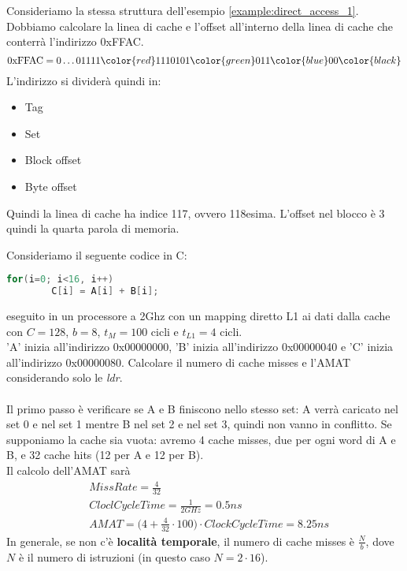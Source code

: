 \begin{example}
	Consideriamo la stessa struttura dell'esempio \ref{example:direct_access_1}. Dobbiamo calcolare la linea di cache e l'offset all'interno della linea
	di cache che conterrà l'indirizzo 0xFFAC.\\
	\begin{equation*}
		\text{0xFFAC} = 0\ldots01111 \color{red}1110 101\color{green}0 11\color{blue}00\color{black} 
	\end{equation*}
	L'indirizzo si dividerà quindi in:
	\begin{itemize}
		\item Tag
		\item \color{red}Set\color{black}
		\item \color{green}Block offset\color{black}
		\item \color{blue}Byte offset \color{black}
	\end{itemize}
	Quindi la linea di cache ha indice 117, ovvero 118esima. L'offset nel blocco è 3 quindi la quarta parola di memoria.
\end{example}

\begin{example}
	Consideriamo il seguente codice in C:
	\begin{lstlisting}[language=C]
		for(i=0; i<16, i++)
		C[i] = A[i] + B[i];
	\end{lstlisting}
	eseguito in un processore a 2Ghz con un mapping diretto L1 ai dati dalla cache con $C = 128$, $b=8$, \(t_M = 100\) cicli e \(t_{L1} = 4\) cicli.\\
	'A' inizia all'indirizzo 0x00000000, 'B' inizia all'indirizzo 0x00000040 e 'C' inizia all'indirizzo 0x00000080. Calcolare il numero di cache misses e l'AMAT considerando solo le \emph{ldr}.\\\\
	Il primo passo è verificare se A e B finiscono nello stesso set: A verrà caricato nel set 0 e nel set 1 mentre B nel set 2 e nel set 3, quindi non vanno in conflitto.
	Se supponiamo la cache sia vuota: avremo 4 cache misses, due per ogni word di A e B, e 32 cache hits (12 per A e 12 per B).\\
	Il calcolo dell'AMAT sarà
	\begin{equation*}
		\begin{split}
			&MissRate = \frac{4}{32}\\
			&CloclCycleTime=\frac{1}{2GHz}=0.5ns\\
			&AMAT=\bigg(4+\frac{4}{32} \cdot 100\bigg) \cdot ClockCycleTime = 8.25ns
		\end{split}
	\end{equation*}
	In generale, se non c'è \textbf{località temporale}, il numero di cache misses è $\frac{N}{b}$, dove $N$ è il numero di istruzioni (in questo caso $N=2\cdot16$).
\end{example}

